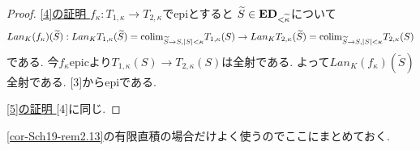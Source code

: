 \documentclass[dvipdfmx,a4paper,11pt]{article}
\newcommand{\colim}{{\rm colim}}
\theoremstyle{definition}
\begin{document}
\begin{proof}
 \underline{[4]の証明 }
 $f_{\kappa}: T_{1, \kappa} \to T_{2, \kappa}$でepiとすると
$\widetilde{S} \in {\bf ED}_{< \widetilde{\kappa}}$について
$$
Lan_{K}(f_{\kappa})(\widetilde{S}): 
Lan_{K}T_{1, \kappa} (\widetilde{S}) = \colim_{\widetilde{S} \to S, |S|<\kappa}T_{1, \kappa}(S)
\to 
Lan_{K}T_{2, \kappa}(\widetilde{S}) = \colim_{\widetilde{S} \to S, |S|<\kappa}T_{2, \kappa}(S)
$$
である.
今$f_{\kappa}$epicより$T_{1, \kappa}(S) \to T_{2, \kappa}(S)$は全射である.
よって$Lan_{K}(f_{\kappa})(\widetilde{S} )$全射である.
[3]からepiである.

 \underline{[5]の証明 } [4]に同じ. 
 \end{proof}


  
\ref{cor-Sch19-rem2.13}の有限直積の場合だけよく使うのでここにまとめておく. 
\end{document}
